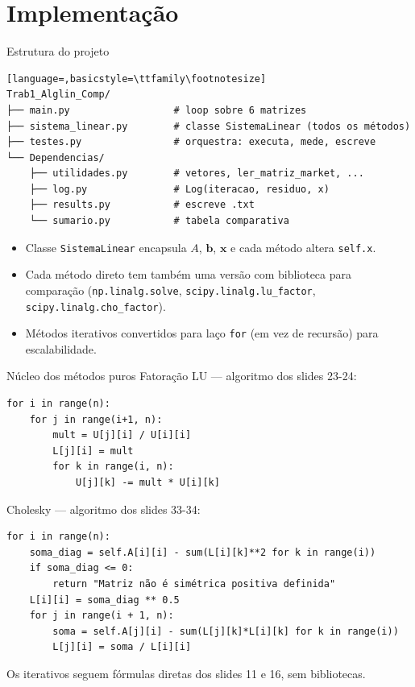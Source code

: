\documentclass[10pt,aspectratio=169]{beamer}
\begin{document}
\section{Implementação}

\begin{frame}[fragile]{Estrutura do projeto}
  \begin{lstlisting}[language=,basicstyle=\ttfamily\footnotesize]
Trab1_Alglin_Comp/
├── main.py                  # loop sobre 6 matrizes
├── sistema_linear.py        # classe SistemaLinear (todos os métodos)
├── testes.py                # orquestra: executa, mede, escreve
└── Dependencias/
    ├── utilidades.py        # vetores, ler_matriz_market, ...
    ├── log.py               # Log(iteracao, residuo, x)
    ├── results.py           # escreve .txt
    └── sumario.py           # tabela comparativa
  \end{lstlisting}

  \vspace{0.6em}
  \begin{itemize}
    \item Classe \texttt{SistemaLinear} encapsula $A$, $\mathbf{b}$, $\mathbf{x}$ e cada método altera \texttt{self.x}.
    \item Cada método direto tem também uma \alert{versão com biblioteca} para comparação (\texttt{np.linalg.solve}, \texttt{scipy.linalg.lu\_factor}, \texttt{scipy.linalg.cho\_factor}).
    \item Métodos iterativos convertidos para laço \texttt{for} (em vez de recursão) para escalabilidade.
  \end{itemize}
\end{frame}

\begin{frame}[fragile]{Núcleo dos métodos puros}
  \alert{Fatoração LU} --- algoritmo dos slides 23-24:
  \begin{lstlisting}
for i in range(n):
    for j in range(i+1, n):
        mult = U[j][i] / U[i][i]
        L[j][i] = mult
        for k in range(i, n):
            U[j][k] -= mult * U[i][k]
  \end{lstlisting}

  \vspace{0.4em}
  \alert{Cholesky} --- algoritmo dos slides 33-34:
  \begin{lstlisting}
for i in range(n):
    soma_diag = self.A[i][i] - sum(L[i][k]**2 for k in range(i))
    if soma_diag <= 0:
        return "Matriz não é simétrica positiva definida"
    L[i][i] = soma_diag ** 0.5
    for j in range(i + 1, n):
        soma = self.A[j][i] - sum(L[j][k]*L[i][k] for k in range(i))
        L[j][i] = soma / L[i][i]
  \end{lstlisting}

  \vspace{0.3em}
  \footnotesize Os iterativos seguem fórmulas diretas dos slides 11 e 16, sem bibliotecas.
\end{frame}
\end{document}
